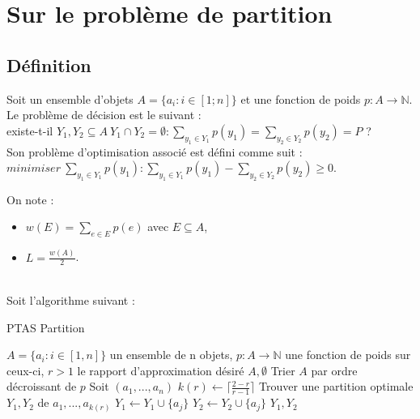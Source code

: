 
\section{Sur le problème de partition}\label{ex5}

\subsection{D\'efinition}\label{ex5_def}
Soit un ensemble d'objets $A = \{a_i : i \in [1;n]\}$ et une fonction de poids $p : A
\rightarrow \mathbb{N}$.\\
Le problème de décision est le suivant : \\
existe-t-il $Y_1,Y_2 \subseteq A\ Y_1 \cap Y_2 = \emptyset: \sum_{y_{1} \in Y_1}p(y_1) = \sum_{y_2 
\in Y_2}p(y_2) = P$ ?\\
Son problème d'optimisation associé est défini comme suit :\\
$minimiser\ \sum_{y_1 \in Y_1}p(y_1) : \sum_{y_1 \in Y_1}p(y_1) - \sum_{y_2 \in Y_2}p(y_2) 
\geq 0$.

On note :
\begin{itemize}
	\item $w(E) = \sum_{e \in E}p(e)$ avec $E \subseteq A$,
	\item $L = \frac{w(A)}{2}$.
\end{itemize}
~\\
Soit l'algorithme suivant :

\begin{center}
\begin{algorithm}[H]
\caption{PTAS Partition}\label{ex5_algo}
\begin{algorithmic}[1]
\REQUIRE $A = \{a_i : i \in [1,n]\}$ un ensemble de n objets,
		 $p : A \rightarrow \mathbb{N}$ une fonction de poids sur ceux-ci,
		 $r > 1$ le rapport d'approximation désiré
		\RETURN $A,\emptyset$
	\ENDIF
	\STATE Trier $A$ par ordre décroissant de $p$
	\STATE Soit $(a_1,...,a_n)$
	\STATE $k(r) \leftarrow \lceil\frac{2-r}{r-1}\rceil$
	\STATE Trouver une partition optimale $Y_1,Y_2$ de $a_1,...,a_{k(r)}$
			\STATE $Y_1 \leftarrow Y_1 \cup \{a_j\}$
		\ELSE
			\STATE $Y_2 \leftarrow Y_2 \cup \{a_j\}$
		\ENDIF
	\ENDFOR
	\RETURN $Y_1,Y_2$
\end{algorithmic}
\end{algorithm}
\end{center}

